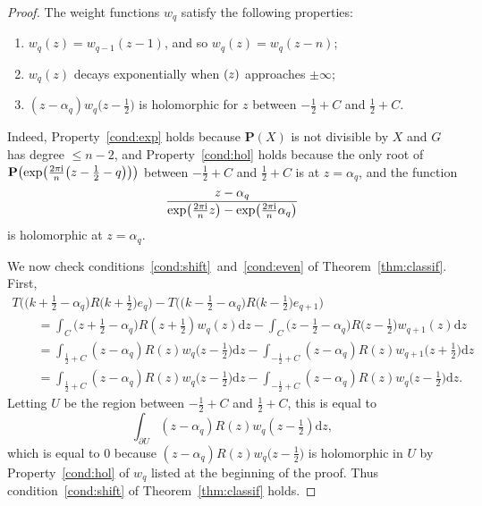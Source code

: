 \documentclass[pdftex]{sigma}
\newcommand\numbers{\textup{(\arabic*)}}
\newcommand\bP{\textbf{P}}
\newcommand\rn{\frac{2\pi {\rm i}}{n}}
\renewcommand\d{\mathrm{d}}
\let\Im\relax
\DeclareMathOperator\Im{Im}
\newcommand\half{\ensuremath{\frac{1}{2}}}
\newcommand\thalf{\ensuremath{\tfrac12}}
\numberwithin{equation}{section}
\theoremstyle{definition}
\begin{document}
\begin{proof}
 The weight functions $w_q$ satisfy the following properties:
 \begin{enumerate}[label=\numbers]\itemsep=0pt
 \item $w_q (z) = w_{q - 1} (z - 1)$,
 and so $w_q (z) = w_q (z - n)$;
 \item $w_q (z)$ decays exponentially
 when $\Im(z)$ approaches $\pm \infty$;
 \label{cond:exp}
 \item $(z - \alpha_q) w_q \bigl(z - \half\bigr)$ is holomorphic
 for $z$ between $-\half + C$ and $\half + C$.
 \label{cond:hol}
 \end{enumerate}
 Indeed, Property~\ref{cond:exp} holds
 because $\bP(X)$ is not divisible by $X$
 and $G$ has degree $\leq n - 2$,
 and Property~\ref{cond:hol} holds
 because the only root of $\bP\bigl(\exp\bigl(\rn \bigl(z - \half - q\bigr)\bigr)\bigr)$
 between $-\half + C$ and $\half + C$
 is at $z = \alpha_q$,
 and the function
 \[
 \frac{z - \alpha_q}{\exp\bigl(\rn z\bigr) - \exp\bigl(\rn \alpha_q\bigr)}\]
 is holomorphic at $z = \alpha_q$.

 We now check conditions~\ref{cond:shift}~and~\ref{cond:even}
 of Theorem~\ref{thm:classif}.
 First,
 \begin{gather*}
 T\bigl( \bigl( k + \thalf - \alpha_q \bigr)
 R\bigl( k + \thalf \bigr) e_q \bigr)
 - T\bigl( \bigl( k - \thalf - \alpha_q \bigr)
 R\bigl( k - \thalf \bigr) e_{q + 1} \bigr) \\
 \qquad= \int_{C} \bigl( z + \thalf - \alpha_q \bigr)
 R(z + \thalf) w_q(z) \d z
 - \int_{C} \bigl( z - \thalf - \alpha_q \bigr)
 R\bigl( z - \thalf \bigr) w_{q + 1}(z) \d z \\
 \qquad= \int_{\half + C} (z - \alpha_q) R(z)
 w_q \bigl( z - \thalf \bigr) \d z
 - \int_{-\half + C} (z - \alpha_q) R(z)
 w_{q + 1} \bigl( z + \thalf \bigr) \d z \\
 \qquad= \int_{\half + C} (z - \alpha_q) R(z)
 w_q \bigl( z - \thalf \bigr) \d z
 - \int_{-\half + C} (z - \alpha_q) R(z)
 w_q \bigl( z - \thalf \bigr) \d z.
 \end{gather*}
 Letting $U$ be the region between $-\half + C$ and $\half + C$,
 this is equal to
 \[
 \int_{\partial U}
 (z - \alpha_q) R(z) w_q \left( z - \thalf \right) \d z,
 \]
 which is equal to $0$ because
 $(z - \alpha_q) R(z) w_q \bigl(z - \half\bigr)$
 is holomorphic in $U$
 by Property~\ref{cond:hol} of $w_q$
 listed at the beginning of the proof.
 Thus condition~\ref{cond:shift} of Theorem~\ref{thm:classif} holds.


\end{proof}
\end{document}
